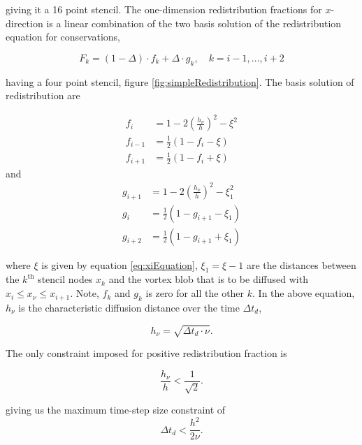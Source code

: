 giving it a 16 point stencil. The one-dimension redistribution fractions for $x$-direction is a linear combination of the two basis solution of the redistribution equation for conservations,

	\begin{equation}
	F_k = \left(1-\Delta\right)\cdot f_k + \Delta\cdot g_k, \quad k = i-1,\dots,i+2
	\end{equation}

having a four point stencil, figure \ref{fig:simpleRedistribution}. The basis solution of redistribution are 

	\begin{subequations}
	\begin{align}
	f_i &= 1 - 2\left(\frac{h_{\nu}}{h}\right)^2 - \xi^2\\
	f_{i-1} &= \frac{1}{2}\left(1-f_i-\xi\right)\\
	f_{i+1} &= \frac{1}{2}\left(1-f_i+\xi\right)
	\end{align}
	\end{subequations}
and 	
	\begin{subequations}
	\begin{align}
	g_{i+1} &= 1 - 2\left(\frac{h_{\nu}}{h}\right)^2 - \xi_1^2\\
	g_{i} &= \frac{1}{2}\left(1-g_{i+1}-\xi_1\right)\\
	g_{i+2} &= \frac{1}{2}\left(1-g_{i+1}+\xi_1\right)
	\end{align}
	\end{subequations}

where $\xi$ is given by equation \ref{eq:xiEquation}, $\xi_1 = \xi - 1$ are the distances between the $k^{\mathrm{th}}$ stencil nodes $x_k$ and the vortex blob that is to be diffused with $x_i \le x_{\nu} \le x_{i+1}$. Note, $f_k$ and $g_k$ is zero for all the other $k$. In the above equation, $h_{\nu}$ is the characteristic diffusion distance over the time $\Delta t_d$, 

	\begin{equation}
	h_{\nu} = \sqrt{\Delta t_d \cdot \nu}.
	\end{equation}
	
	
The only constraint imposed  for positive redistribution fraction is

	\begin{equation}
	\frac{h_{\nu}}{h} < \frac{1}{\sqrt{2}}.
	\end{equation}
	
giving us the maximum time-step size constraint of
	\begin{equation}
	\Delta t_d < \frac{h^2}{2\nu}.
	\end{equation}

